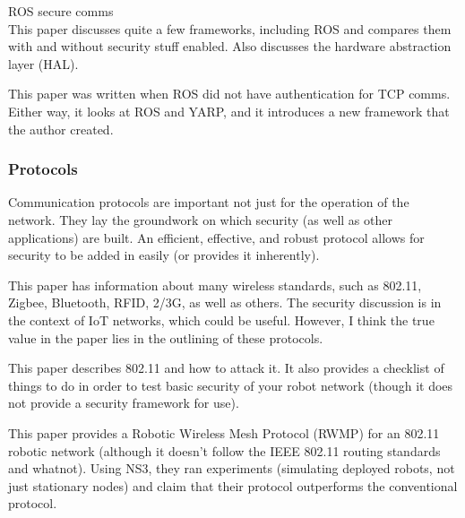 
ROS secure comms \cite{inproceedings:Breiling}\\

This paper \cite{article:Martin} discusses quite a few frameworks, including ROS and compares them with and without security stuff enabled. Also discusses the hardware abstraction layer (HAL).

This paper \cite{thesis:Shyvakov} was written when ROS did not have authentication for TCP comms. Either way, it looks at ROS and YARP, and it introduces a new framework that the author created.

\subsubsection{Protocols} %

Communication protocols are important not just for the operation of the network. They lay the groundwork on which security (as well as other applications) are built. An efficient, effective, and robust protocol allows for security to be added in easily (or provides it inherently).

This paper \cite{Burg2018} has information about many wireless standards, such as 802.11, Zigbee, Bluetooth, RFID, 2/3G, as well as others. The security discussion is in the context of IoT networks, which could be useful. However, I think the true value in the paper lies in the outlining of these protocols.

This paper \cite{Basan:2018:DMT:3264437.3264482} describes 802.11 and how to attack it. It also provides a checklist of things to do in order to test basic security of your robot network (though it does not provide a security framework for use).

This paper \cite{Trivedi:2018} provides a Robotic Wireless Mesh Protocol (RWMP) for an 802.11 robotic network (although it doesn't follow the IEEE 802.11 routing standards and whatnot). Using NS3, they ran experiments (simulating deployed robots, not just stationary nodes) and claim that their protocol outperforms the conventional protocol.

